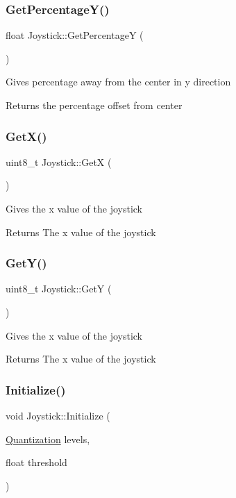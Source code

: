 \subsubsection{\texorpdfstring{Get\+Percentage\+Y()}{GetPercentageY()}}
{\footnotesize\ttfamily float Joystick\+::\+Get\+PercentageY (\begin{DoxyParamCaption}{ }\end{DoxyParamCaption})}

Gives percentage away from the center in y direction \begin{DoxyReturn}{Returns}
the percentage offset from center 
\end{DoxyReturn}
\hypertarget{class_joystick_ae578e9c06313f37a53c3b0c4e0ca014d}{}\label{class_joystick_ae578e9c06313f37a53c3b0c4e0ca014d} 
\subsubsection{\texorpdfstring{Get\+X()}{GetX()}}
{\footnotesize\ttfamily uint8\+\_\+t Joystick\+::\+GetX (\begin{DoxyParamCaption}{ }\end{DoxyParamCaption})}

Gives the x value of the joystick \begin{DoxyReturn}{Returns}
The x value of the joystick 
\end{DoxyReturn}
\hypertarget{class_joystick_a849ffb99289dcb3186e532fd1115cf46}{}\label{class_joystick_a849ffb99289dcb3186e532fd1115cf46} 
\subsubsection{\texorpdfstring{Get\+Y()}{GetY()}}
{\footnotesize\ttfamily uint8\+\_\+t Joystick\+::\+GetY (\begin{DoxyParamCaption}{ }\end{DoxyParamCaption})}

Gives the x value of the joystick \begin{DoxyReturn}{Returns}
The x value of the joystick 
\end{DoxyReturn}
\hypertarget{class_joystick_a81ab2867d039ed9c974ee56c10063d8e}{}\label{class_joystick_a81ab2867d039ed9c974ee56c10063d8e} 
\subsubsection{\texorpdfstring{Initialize()}{Initialize()}}
{\footnotesize\ttfamily void Joystick\+::\+Initialize (\begin{DoxyParamCaption}\item[{\hyperlink{struct_quantization}{Quantization}}]{levels,  }\item[{float}]{threshold }\end{DoxyParamCaption})}


